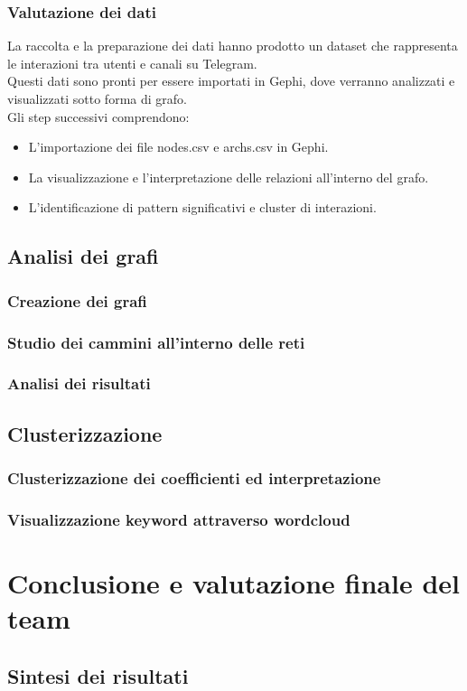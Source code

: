 \documentclass[12pt]{article}
\begin{document}
	\subsubsection{Valutazione dei dati}
	La raccolta e la preparazione dei dati hanno prodotto un dataset che rappresenta le interazioni tra utenti e canali su Telegram. \\Questi dati sono pronti per essere importati in Gephi, dove verranno analizzati e visualizzati sotto forma di grafo.
	\\
	Gli step successivi comprendono:
	\begin{itemize}[label=] 
		\item L'importazione dei file nodes.csv e archs.csv in Gephi.
		\item La visualizzazione e l'interpretazione delle relazioni all'interno del grafo.
		\item L'identificazione di pattern significativi e cluster di interazioni.
	\end{itemize}
	\subsection{Analisi dei grafi}
	\subsubsection{Creazione dei grafi}
	\subsubsection{Studio dei cammini all'interno delle reti}
	\subsubsection{Analisi dei risultati}
	\subsection{Clusterizzazione}
	\subsubsection{Clusterizzazione dei coefficienti ed interpretazione}
	\subsubsection{Visualizzazione keyword attraverso wordcloud}
	\section{Conclusione e valutazione finale del team}
	\subsection{Sintesi dei risultati}
	
	
\end{document}
